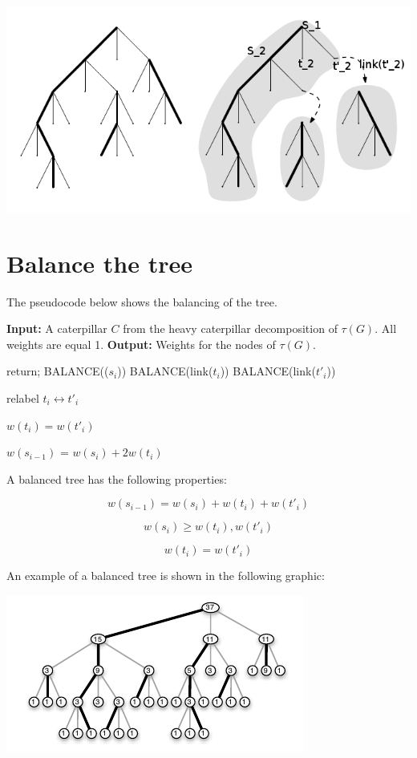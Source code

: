 \begin{center}
\includegraphics[scale=0.7]{./figures/caterpillarEdit.png} 
\end{center}

\section*{Balance the tree}

The pseudocode below shows the balancing of the tree.

\begin{algorithmic}
\State \textbf{Input:} A caterpillar $C$ from the heavy caterpillar decomposition of $\tau(G)$. All weights are equal 1.
\State \textbf{Output:} Weights for the nodes of $\tau(G)$.

	\State return;
\Else
	\State BALANCE(($s_i$))
	\State BALANCE(link($t_i$))
	\State BALANCE(link($t'_i$))

        \State relabel $t_i \leftrightarrow t'_i$
	\EndIf

	\State $w(t_i)=w(t'_i)$
	
	\State $w(s_{i-1})$ = $w(s_i) + 2w(t_i)$ 
\EndIf
\EndFunction
\end{algorithmic}
A balanced tree has the following properties:

$$w(s_{i-1})= w(s_i) + w(t_i) + w(t'_i)$$

$$w(s_i)\geq w(t_i),w(t'_i) $$

$$w(t_i)= w(t'_i) $$

An example of a balanced tree is shown in the following graphic: 

\begin{center}
\includegraphics[scale=1]{./figures/balancedTree.png} 
\end{center}

